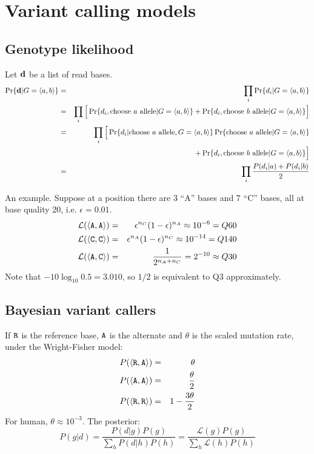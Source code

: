 \documentclass[10pt]{article}
\begin{document}
\newpage

\section{Variant calling models}

\subsection{Genotype likelihood}
Let ${\bf d}$ be a list of read bases.
\begin{eqnarray*}
\Pr\{{\bf d}|G=\langle a,b\rangle\}
&=&\prod_i\Pr\{d_i|G=\langle a,b\rangle\}\\
&=&\prod_i\Big[\Pr\{d_i,\mbox{choose $a$ allele}|G=\langle a,b\rangle\}+\Pr\{d_i,\mbox{choose $b$ allele}|G=\langle a,b\rangle\}\Big]\\
&=&\prod_i\Big[\Pr\{d_i|\mbox{choose $a$ allele},G=\langle a,b\rangle\}\Pr\{\mbox{choose $a$ allele}|G=\langle a,b\rangle\}\\
&&+\Pr\{d_i,\mbox{choose $b$ allele}|G=\langle a,b\rangle\}\Big]\\
&=&\prod_i\frac{P(d_i|a)+P(d_i|b)}{2}
\end{eqnarray*}

An example. Suppose at a position there are 3 ``A'' bases and 7 ``C'' bases,
all at base quality 20, i.e. $\epsilon=0.01$.
\begin{eqnarray*}
\mathcal{L}(\langle{\tt A},{\tt A}\rangle)&=&\epsilon^{n_C}(1-\epsilon)^{n_A}\approx10^{-6}=Q60\\
\mathcal{L}(\langle{\tt C},{\tt C}\rangle)&=&\epsilon^{n_A}(1-\epsilon)^{n_C}\approx10^{-14}=Q140\\
\mathcal{L}(\langle{\tt A},{\tt C}\rangle)&=&\frac{1}{2^{n_A+n_C}}=2^{-10}\approx Q30
\end{eqnarray*}
Note that $-10\log_{10}0.5=3.010$, so $1/2$ is equivalent to Q3 approximately.

\subsection{Bayesian variant callers}
If ${\tt R}$ is the reference base, ${\tt A}$ is the alternate and $\theta$ is
the scaled mutation rate, under the Wright-Fisher model:
\begin{eqnarray*}
P(\langle{\tt R},{\tt A}\rangle)&=&\theta\\
P(\langle{\tt A},{\tt A}\rangle)&=&\frac{\theta}{2}\\
P(\langle{\tt R},{\tt R}\rangle)&=&1-\frac{3\theta}{2}\\
\end{eqnarray*}
For human, $\theta\approx10^{-3}$. The posterior:
$$
P(g|d)=\frac{P(d|g)P(g)}{\sum_hP(d|h)P(h)}=\frac{\mathcal{L}(g)P(g)}{\sum_h\mathcal{L}(h)P(h)}
$$
\end{document}
